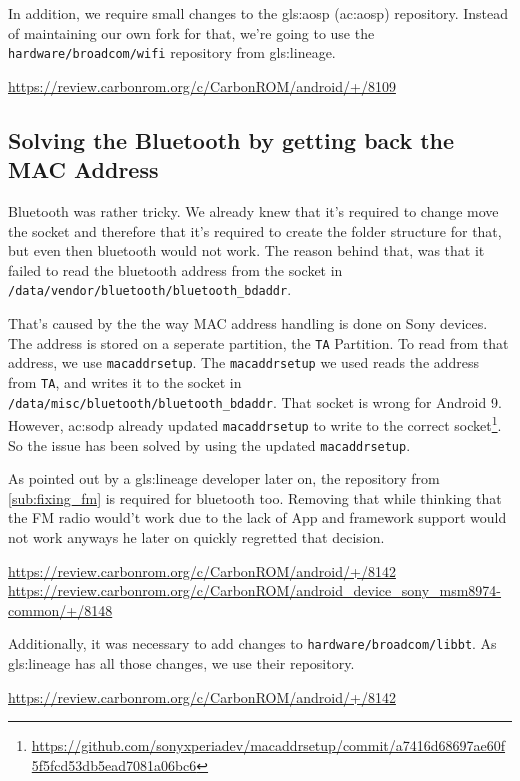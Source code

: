 In addition, we require small changes to the \gls{gls:aosp} (\acrshort{ac:aosp}) repository. Instead of maintaining our own fork for that, we're going to use the \texttt{hardware/broadcom/wifi} repository from \gls{gls:lineage}.

\url{https://review.carbonrom.org/c/CarbonROM/android/+/8109}

\subsection{Solving the Bluetooth by getting back the MAC Address}

Bluetooth was rather tricky. We already knew that it's required to change move the socket and therefore that it's required to create the folder structure for that, but even then bluetooth would not work. The reason behind that, was that it failed to read the bluetooth address from the socket in \texttt{/data/vendor/bluetooth/bluetooth\_bdaddr}.

That's caused by the the way MAC address handling is done on Sony devices. The address is stored on a seperate partition, the \texttt{TA} Partition.
To read from that address, we use \texttt{macaddrsetup}. The \texttt{macaddrsetup} we used reads the address from \texttt{TA}, and writes it to the socket in \texttt{/data/misc/bluetooth/bluetooth\_bdaddr}. That socket is wrong for Android 9. However, \acrshort{ac:sodp} already updated \texttt{macaddrsetup} to write to the correct socket\footnote{\url{https://github.com/sonyxperiadev/macaddrsetup/commit/a7416d68697ae60f5f5fcd53db5ead7081a06bc6}}. So the issue has been solved by using the updated \texttt{macaddrsetup}.

As pointed out by a \gls{gls:lineage} developer later on, the \texttt{} repository from \ref{sub:fixing_fm} is required for bluetooth too. Removing that while thinking that the FM radio would't work due to the lack of App and framework support would not work anyways he later on quickly regretted that decision.

\url{https://review.carbonrom.org/c/CarbonROM/android/+/8142}\\
\url{https://review.carbonrom.org/c/CarbonROM/android_device_sony_msm8974-common/+/8148}

Additionally, it was necessary to add changes to \texttt{hardware/broadcom/libbt}. As \gls{gls:lineage} has all those changes, we use their repository.

\url{https://review.carbonrom.org/c/CarbonROM/android/+/8142}

